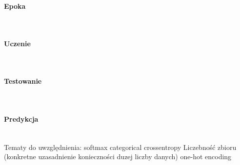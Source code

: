 \paragraph{Epoka} \mbox{}\\

\paragraph{Uczenie} \mbox{}\\

\paragraph{Testowanie} \mbox{}\\

\paragraph{Predykcja} \mbox{}\\

Tematy do uwzględnienia:
softmax
categorical crossentropy
Liczebność zbioru (konkretne uzasadnienie konieczności duzej liczby danych)
one-hot encoding

